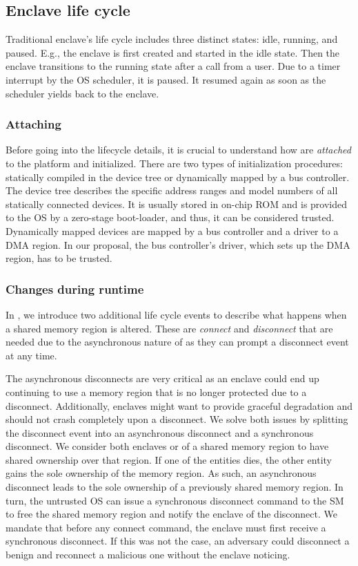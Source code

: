 \subsection{Enclave life cycle}
\label{sec:lifeycle}

Traditional enclave's life cycle includes three distinct states: idle, running, and paused. E.g., the enclave is first created and started in the idle state. Then the enclave transitions to the running state after a call from a user. Due to a timer interrupt by the OS scheduler, it is paused. It resumed again as soon as the scheduler yields back to the enclave. 

\subsubsection{Attaching \sphw}
Before going into the lifecycle details, it is crucial to understand how \sphw are \emph{attached} to the platform and initialized.
There are two types of initialization procedures: statically compiled in the device tree or dynamically mapped by a bus controller. 
The device tree describes the specific address ranges and model numbers of all statically connected \sphw devices. It is usually stored in on-chip ROM and is provided to the OS by a zero-stage boot-loader, and thus, it can be considered trusted.
Dynamically mapped devices are mapped by a bus controller and a driver to a DMA region. In our proposal, the bus controller's driver, which sets up the DMA region, has to be trusted.

\subsubsection{Changes during runtime}
In \name{}, we introduce two additional life cycle events to describe what happens when a shared memory region is altered. These are \emph{connect} and \emph{disconnect} that are needed due to the asynchronous nature of \sphw as they can prompt a disconnect event at any time.

The asynchronous disconnects are very critical as an enclave could end up continuing to use a memory region that is no longer protected due to a disconnect. Additionally, enclaves might want to provide graceful degradation and should not crash completely upon a disconnect. We solve both issues by splitting the disconnect event into an asynchronous disconnect and a synchronous disconnect. We consider both enclaves or \sphw of a shared memory region to have shared ownership over that region. If one of the entities dies, the other entity gains the sole ownership of the memory region. As such, an asynchronous disconnect leads to the sole ownership of a previously shared memory region. In turn, the untrusted OS can issue a synchronous disconnect command to the SM to free the shared memory region and notify the enclave of the disconnect. We mandate that before any connect command, the enclave must first receive a synchronous disconnect. If this was not the case, an adversary could disconnect a benign \sphw and reconnect a malicious one without the enclave noticing.


